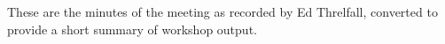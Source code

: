 These are the minutes of the meeting as recorded by Ed Threlfall, converted to
provide a short summary of workshop output. 
